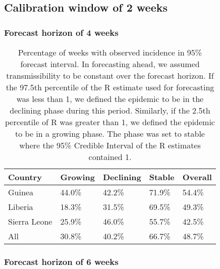 \documentclass[9pt,twoside,lineno]{pnas-new}
\begin{document}
\subsection{Calibration window of 2 weeks}\label{sec:pm2}
\subsubsection{Forecast horizon of 4 weeks}\label{sec:pm24}

\begin{table}
  \centering
  \caption{Percentage of weeks with observed incidence in 95\% forecast
    interval. In forecasting ahead, we assumed transmissibility to be
    constant over the forecast horizon. If the 97.5th percentile of the R
    estimate used for forecasting was less than 1, we defined the epidemic
    to be in the declining phase during this period. Similarly, if the 2.5th
    percentile of R was greater than 1, we defined the epidemic to be in a
    growing phase. The phase was set to stable where the 95\% Credible
    Interval of the R estimates contained 1.}
  \label{tab:propinci}
  \begin{tabular}{lllll}
    \toprule
    Country  & Growing & Declining & Stable & Overall \\
    \midrule
    Guinea  & 44.0\% & 42.2\% & 71.9\% & 54.4\% \\
    Liberia & 18.3\% & 31.5\% & 69.5\% & 49.3\% \\
    Sierra Leone & 25.9\% & 46.0\% & 55.7\% & 42.5\% \\
    All & 30.8\% & 40.2\% & 66.7\% & 48.7\% \\
    \bottomrule
  \end{tabular}
\end{table}

\subsubsection{Forecast horizon of 6 weeks}\label{sec:pm26} 
\end{document}
